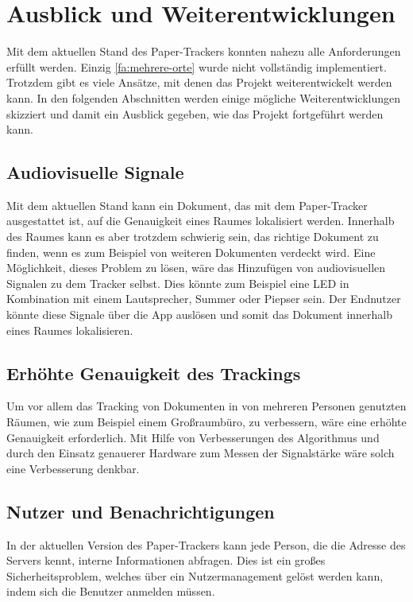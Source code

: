\chapter{Ausblick und Weiterentwicklungen}

Mit dem aktuellen Stand des Paper-Trackers konnten nahezu alle Anforderungen erfüllt werden. Einzig \ref*{fa:mehrere-orte} wurde nicht vollständig implementiert.
Trotzdem gibt es viele Ansätze, mit denen das Projekt weiterentwickelt werden kann.
In den folgenden Abschnitten werden einige mögliche Weiterentwicklungen skizziert und damit ein Ausblick gegeben,
wie das Projekt fortgeführt werden kann.

\section{Audiovisuelle Signale}

Mit dem aktuellen Stand kann ein Dokument, das mit dem Paper-Tracker ausgestattet ist, auf die Genauigkeit eines Raumes
lokalisiert werden.
Innerhalb des Raumes kann es aber trotzdem schwierig sein, das richtige Dokument zu finden, wenn es zum Beispiel von
weiteren Dokumenten verdeckt wird.
Eine Möglichkeit, dieses Problem zu lösen, wäre das Hinzufügen von audiovisuellen Signalen zu dem Tracker selbst.
Dies könnte zum Beispiel eine \gls{LED} in Kombination mit einem Lautsprecher, Summer oder Piepser sein.
Der Endnutzer könnte diese Signale über die App auslösen und somit das Dokument innerhalb eines Raumes lokalisieren.

\section{Erhöhte Genauigkeit des Trackings}

Um vor allem das Tracking von Dokumenten in von mehreren Personen genutzten Räumen, wie zum Beispiel einem Großraumbüro,
zu verbessern, wäre eine erhöhte Genauigkeit erforderlich.
Mit Hilfe von Verbesserungen des Algorithmus und durch den Einsatz genauerer Hardware zum Messen der Signalstärke wäre solch eine Verbesserung denkbar.

\section{Nutzer und Benachrichtigungen}

In der aktuellen Version des Paper-Trackers kann jede Person, die die Adresse des Servers kennt, interne Informationen
abfragen.
Dies ist ein großes Sicherheitsproblem, welches über ein Nutzermanagement gelöst werden kann, indem sich die Benutzer
anmelden müssen.

